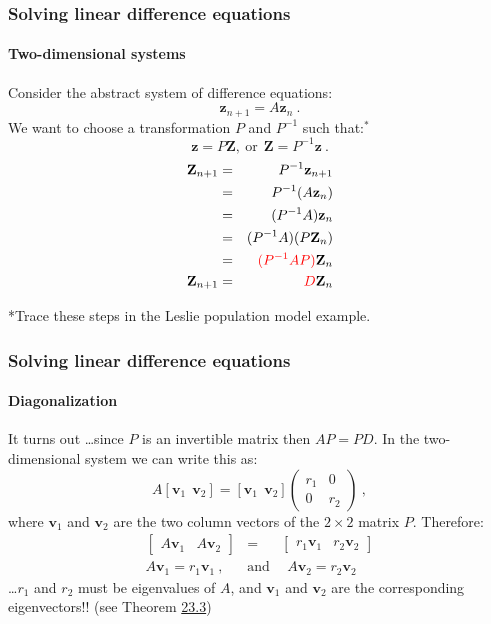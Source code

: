 \documentclass[10pt, handout]{beamer}
\begin{document}
\begin{frame}
\frametitle{Solving linear difference equations}
\framesubtitle{Two-dimensional systems}
Consider the abstract system of difference equations:
$$ \mathbf{z}_{n+1} =   A\mathbf{z}_n~. $$
We want to choose a transformation $P$ and $P^{-1}$ such that:$^{*}$ 
$$\mathbf{z} = P\mathbf{Z}, ~{\text{or}}~~ \mathbf{Z} = P^{-1}\mathbf{z}~.$$
\begin{eqnarray}
\mathbf{Z}_{n+1} &=& P^{-1}\mathbf{z}_{n+1} \nonumber \\
 &=& P^{-1}(A\mathbf{z}_{n}) \nonumber \\
 &=& (P^{-1}A)\mathbf{z}_{n} \nonumber \\
 &=& (P^{-1}A)(P\mathbf{Z}_{n}) \nonumber \\
 &=& {\color{red}{(P^{-1}{A}P)}}\mathbf{Z}_{n} \nonumber \\
\mathbf{Z}_{n+1} &=& {\color{red}{D}}\mathbf{Z}_{n}  
\end{eqnarray}

\vfill
{\footnotesize{*Trace these steps in the Leslie population model example.}}
\end{frame}



\begin{frame}
\frametitle{Solving linear difference equations}
\framesubtitle{Diagonalization} 
It turns out \ldots since $P$ is an invertible matrix then $AP=PD$. In the two-dimensional system we can write this as: $$A[\mathbf{v}_1 ~~ \mathbf{v}_2] = [\mathbf{v}_1 ~~ \mathbf{v}_2]\begin{pmatrix}
r_1 & 0 \\ 0 & r_2 \end{pmatrix} ~,$$ where $\mathbf{v}_1$ and $\mathbf{v}_2$ are the two column vectors of the $2 \times 2$ matrix $P$. Therefore:
\begin{eqnarray}
\begin{bmatrix} A\mathbf{v}_1 & A\mathbf{v}_2
\end{bmatrix} &=& \begin{bmatrix}
r_1\mathbf{v}_1 & r_2\mathbf{v}_2
\end{bmatrix} \nonumber \\
A\mathbf{v}_1 = r_1\mathbf{v}_1~, & {\text{and}} &~~  A\mathbf{v}_2 = r_2\mathbf{v}_2 \nonumber
\end{eqnarray}
\ldots $r_1$ and $r_2$ must be eigenvalues of $A$, and $\mathbf{v}_1$ and $\mathbf{v}_2$ are the corresponding eigenvectors!! (see Theorem \href{th23.3}{23.3}) \\ \vskip0.1in


\end{frame}
\end{document}
